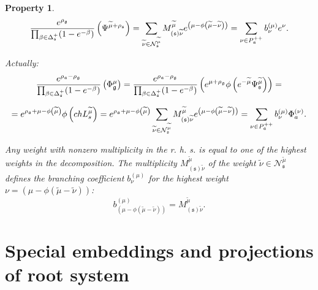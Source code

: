 \documentclass{article}
\newtheorem{Prop}[Def]{Property}
\newcommand{\gf}{\mathfrak{g}}
\newcommand{\sfr}{\mathfrak{s}}
\begin{document}
\begin{Prop}
\begin{equation}
\frac{e^{\rho _{\gf}}}{\prod_{\beta \in \Delta _{\sfr%
}^{+}}(1-e^{-\beta })}\left( \Psi ^{\widetilde{\mu }+\rho _{\sfr%
}}\right) =\sum_{\widetilde{\nu }\in \mathcal{N}_{\sfr}^{\widetilde{\mu }%
}}M_{\left( \sfr\right) \widetilde{\nu }}^{\widetilde{\mu }}e^{\left(
\mu -\phi \left( \widetilde{\mu }-\widetilde{\nu }\right) \right)
}=\sum_{\nu \in P_{\frak{a}}^{++}}b_{\nu }^{(\mu )}e^{\nu }.
\label{singular main-4}
\end{equation}

Actually:
\begin{equation}
\frac{e^{\rho _{\frak{a}}-\rho _{\gf}}}{\prod_{\beta \in \Delta _{\sfr%
}^{+}}(1-e^{-\beta })}\left( \Phi ^{\mu }_{\gf}\right) = \frac{e^{\rho _{\frak{a}}-\rho _{\gf}}}{\prod_{\beta \in \Delta _{\sfr%
}^{+}}(1-e^{-\beta })}\left( e^{\mu +\rho _{\gf}}\phi\left( e^{-\widetilde{\mu }}\Psi^{\widetilde{\mu }}_{\sfr}\right)\right) = 
\end{equation}

\begin{equation}
= e^{\rho _{\frak{a}}+\mu-\phi\left(\widetilde{\mu }\right)}\phi\left(ch L_s^{\widetilde{\mu }}\right) = e^{\rho _{\frak{a}}+\mu-\phi\left(\widetilde{\mu }\right)}\sum_{\widetilde{\nu }\in \mathcal{N}_{\sfr}^{\widetilde{\mu }%
}}M_{\left( \sfr\right) \widetilde{\nu }}^{\widetilde{\mu }}e^{\left(
\mu -\phi \left( \widetilde{\mu }-\widetilde{\nu }\right) \right)} =\sum_{\nu \in P_{\frak{a}}^{++}}b_{\nu }^{(\mu )}\Phi_a^{\left(\nu\right)}.
\end{equation}

Any weight with nonzero multiplicity in the r. h. s. is equal to one of the
highest weights in the decomposition. The multiplicity $M_{\left( \sfr%
\right) \widetilde{\nu }}^{\widetilde{\mu }}$ of the weight  $\widetilde{\nu
}\in \mathcal{N}_{\sfr}^{\widetilde{\mu }}$ defines the branching
coefficient $b_{\nu }^{(\mu )}$ for the highest weight $\nu =\left( \mu
-\phi \left( \widetilde{\mu }-\widetilde{\nu }\right) \right) $:
\[
b_{\left( \mu -\phi \left( \widetilde{\mu }-\widetilde{\nu }\right) \right)
}^{(\mu )}=M_{\left( \sfr\right) \widetilde{\nu }}^{\widetilde{\mu }}.
\]
\end{Prop}



\section{Special embeddings and projections of root system}
\label{sec:spec-embedd-proj}
\end{document}
